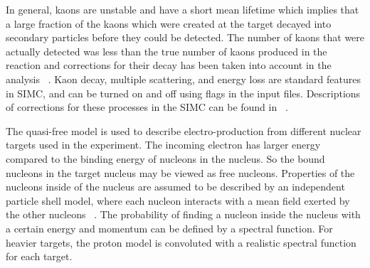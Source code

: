 \label{Kaon Decay}
In general, kaons are unstable and have a short mean lifetime which implies that a large fraction of the kaons which were created at the target decayed into secondary particles before they could be detected. The number of kaons that were actually detected was less than the true number of kaons produced in the reaction and corrections for their decay has been taken into account in the analysis ~\cite{RM99}. Kaon decay, multiple scattering, and energy loss are standard features in SIMC, and can be turned on and off using flags in the input files. Descriptions of corrections for these processes in the SIMC can be found in ~\cite{GaskelD}.

\label{Spectral Function}
The quasi-free model is used to describe electro-production from different nuclear targets used in the experiment. The incoming electron has larger energy compared to the binding energy of nucleons in the nucleus. So the bound nucleons in the target nucleus may be viewed as free nucleons. Properties of the nucleons inside of the nucleus are assumed to be described by an independent particle shell model, where each nucleon interacts with a mean field exerted by the other nucleons ~\cite{BC06}. The probability of finding a nucleon inside the nucleus with a certain energy and momentum can be defined by a spectral function. For heavier targets, the proton model is convoluted with a realistic spectral function for each target.

